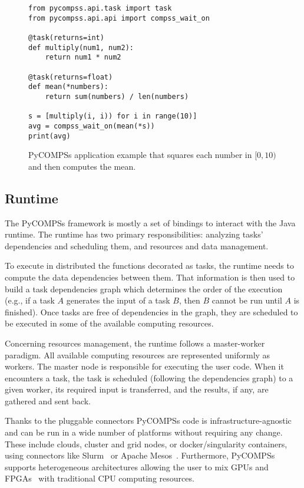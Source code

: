 \begin{figure}[t!]
\centering
\begin{verbatim}
from pycompss.api.task import task
from pycompss.api.api import compss_wait_on

@task(returns=int)
def multiply(num1, num2):
    return num1 * num2

@task(returns=float)
def mean(*numbers):
    return sum(numbers) / len(numbers)

s = [multiply(i, i)) for i in range(10)]
avg = compss_wait_on(mean(*s))
print(avg)
\end{verbatim}
\caption{PyCOMPSs application example that squares each number in $[0, 10)$ and then computes the mean.}
\label{fig:annotation}
\end{figure}


\subsection{Runtime}

The PyCOMPSs framework is mostly a set of bindings to interact with the Java runtime. The runtime has two primary responsibilities: analyzing tasks' dependencies and scheduling them, and resources and data management.

To execute in distributed the functions decorated as tasks, the runtime needs to compute the data dependencies between them. That information is then used to build a task dependencies graph which determines the order of the execution (e.g., if a task $A$ generates the input of a task $B$, then $B$ cannot be run until $A$ is finished). Once tasks are free of dependencies in the graph, they are scheduled to be executed in some of the available computing resources.

Concerning resources management, the runtime follows a master-worker paradigm. All available computing resources are represented uniformly as workers. The master node is responsible for executing the user code. When it encounters a task, the task is scheduled (following the dependencies graph) to a given worker, its required input is transferred, and the results, if any, are gathered and sent back.

Thanks to the pluggable connectors PyCOMPSs code is infrastructure-agnostic and can be run in a wide number of platforms without requiring any change. These include clouds, cluster and grid nodes, or docker/singularity containers, using connectors like Slurm~\cite{slurm} or Apache Mesos~\cite{mesos}. Furthermore, PyCOMPSs supports heterogeneous architectures allowing the user to mix GPUs and FPGAs~\cite{amela17} with traditional CPU computing resources.

